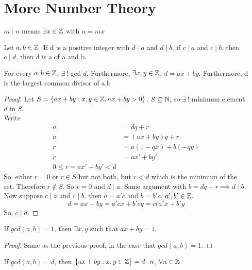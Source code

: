 \documentclass[openany]{report}
\begin{document}
\section{More Number Theory}
\begin{definition}
    $m \mid n$ means $\exists x \in \mathbb{Z}$ with $n = mx$
\end{definition}
\begin{definition}\label{def:gcd}
    Let $a,b \in \mathbb{Z}$. If d is a positive integer with $d \mid a$ and $d \mid b$, if $c \mid a$ and $c \mid b$, then $c \mid d$, then d is a  of a and b.
\end{definition}
\begin{theorem}\label{thm:gcd}
    For every $a,b \in \mathbb{Z}$, $\exists \ !$ gcd $d$. Furthermore, $\exists x,y \in \mathbb{Z}$, $d = ax + by$. Furthermore, d is the largest common divisor of a,b
\end{theorem}
\begin{proof}
    Let $S = \{ ax + by : x,y \in \mathbb{Z}, ax + by > 0\}$. $S \subseteq \mathbb{N}$, so $\exists \ !$ minimum element $d$ in $S$.\\
    Write
    \begin{align*}
        a &= dq + r\tag{$0 \leq r < d$}\\
        a &= (ax + by)q + r\tag{some $x,y \in \ints$}\\
        r &= a(1-qx) + b(-qy)\\
        r &= ax' + by'\tag{$x' = 1-qx$, $y' = -qy$}\\
        0 \leq r = ax' + by' < d
    \end{align*}
    So. either $r = 0$ or $r \in S$ but not both, but $r < d$ which is the minimum of the set. Therefore $r \not\in S$. So $r = 0$ and $d \mid a$. Same argument with $b = dq + r \implies d \mid b$.\\
    Now suppose $c \mid a$ and $c \mid b$, then $a = a'c$ and $b = b'c$, $a',b' \in \mathbb{Z}$.
    $$d = ax + by = a'cx + b'cy = c(a'x + b'y$$
    So, $c \mid d$.
\end{proof}
\begin{corollary}
If $gcd(a,b) = 1$, then $\exists x,y$ such that $ax + by = 1$.
\end{corollary}
\begin{proof}
    Same as the previous proof, in the case that $gcd(a,b) = 1$.
\end{proof}
\begin{corollary}
    If $gcd(a,b) = d$, then $\{ax + by: x,y \in \mathbb{Z}\} = d\cdot n$, $\forall n \in \mathbb{Z}$.
\end{corollary}
\end{document}
